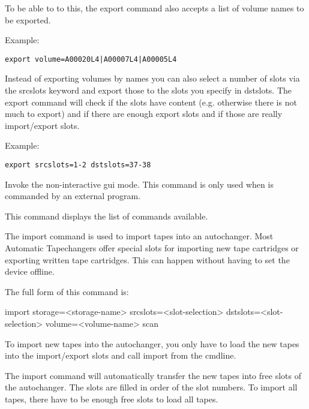 \begin{description}
{   To be able to to this, the export command also accepts a list of volume names
   to be exported.

   Example:

\footnotesize
\begin{verbatim}
export volume=A00020L4|A00007L4|A00005L4
\end{verbatim}
\normalsize

   Instead of exporting volumes by names you can also select a number of slots via
   the srcslots keyword and export those to the slots you specify in dstslots. The export
   command will check if the slots have content (e.g. otherwise there is not much to
   export) and if there are enough export slots and if those are really import/export slots.

   Example:

\footnotesize
\begin{verbatim}
export srcslots=1-2 dstslots=37-38
\end{verbatim}
\normalsize

\item [gui]
    Invoke the non-interactive gui mode.
    This command is only used when  is commanded by an external program.

\item [help]
   This command displays the list of commands available.

\item [import]
   The import command is used to import tapes into an autochanger. Most Automatic
   Tapechangers offer special slots for importing new tape cartridges or
   exporting written tape cartridges. This can happen without having to set
   the device offline.

   The full form of this command is:

import storage={\textless}storage-name{\textgreater} {\textlbrack} srcslots={\textless}slot-selection{\textgreater}
  dstslots={\textless}slot-selection{\textgreater} volume={\textless}volume-name{\textgreater} scan {\textrbrack}

   To import new tapes into the autochanger, you only have to load the new
   tapes into the import/export slots and call import from the cmdline.

   The import command will automatically transfer the new tapes into free
   slots of the autochanger. The slots are filled in order of the slot numbers.
   To import all tapes, there have to be enough free slots to load all tapes.

}
\end{description}
